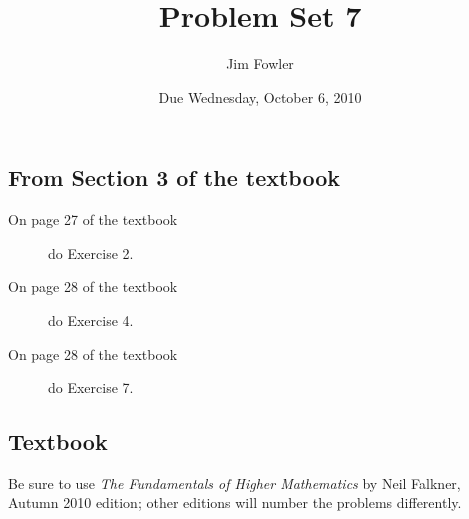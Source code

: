 \documentclass[12pt]{handout}
\author{Jim Fowler}
\title{Problem Set 7}
\date{Due Wednesday, October  6, 2010}
\begin{document}
\maketitle










\subsection*{From Section 3 of the textbook}



\begin{description}

\item[On page 27 of the textbook] do Exercise 2.

\item[On page 28 of the textbook] do Exercise 4.

\item[On page 28 of the textbook] do Exercise 7.

\end{description}











\subsection*{Textbook}
Be sure to use \textit{The Fundamentals of Higher Mathematics} by Neil Falkner, Autumn 2010 edition; other editions will number the problems differently.
\end{document}
